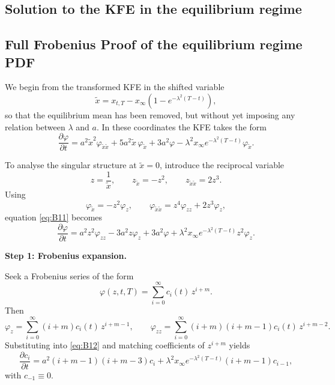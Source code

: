 \documentclass[12pt]{article}
\theoremstyle{statementstyle}
\begin{document}
\begin{appendices}
\section{Solution to the KFE in the equilibrium regime}
\label{appendix:B}

\subsection{Full Frobenius Proof of the equilibrium regime PDF}
\label{appendix:B1}

We begin from the transformed KFE in the shifted variable
\[
\widetilde{x}
=
x_{t,T}
-
x_{\infty}\!\left(1-e^{-\lambda^{2}(T-t)}\right),
\]
so that the equilibrium mean has been removed, but without yet imposing any
relation between \(\lambda\) and \(a\). In these coordinates the KFE takes the form
\begin{equation}
\frac{\partial \varphi}{\partial t}
=
a^{2}\widetilde{x}^{2}\varphi_{\widetilde{x}\widetilde{x}}
+
5a^{2}\widetilde{x}\,\varphi_{\widetilde{x}}
+
3a^{2}\varphi
-
\lambda^{2}x_{\infty}e^{-\lambda^{2}(T-t)}\varphi_{\widetilde{x}}.
\tag{B.1.1}\label{eq:B11}
\end{equation}

To analyse the singular structure at \(\widetilde{x}=0\), introduce the reciprocal
variable
\[
z=\frac{1}{\widetilde{x}},
\qquad
z_{\widetilde{x}}=-z^{2},
\qquad
z_{\widetilde{x}\widetilde{x}}=2z^{3}.
\]
Using
\[
\varphi_{\widetilde{x}}=-z^{2}\varphi_{z},
\qquad
\varphi_{\widetilde{x}\widetilde{x}}
=
z^{4}\varphi_{zz}+2z^{3}\varphi_{z},
\]
equation \eqref{eq:B11} becomes
\begin{equation}
\frac{\partial \varphi}{\partial t}
=
a^{2}z^{2}\varphi_{zz}
-
3a^{2}z\varphi_{z}
+
3a^{2}\varphi
+
\lambda^{2}x_{\infty}e^{-\lambda^{2}(T-t)}z^{2}\varphi_{z}.
\tag{B.1.2}\label{eq:B12}
\end{equation}

\medskip
\noindent\textbf{Step 1: Frobenius expansion.}

Seek a Frobenius series of the form
\[
\varphi(z,t,T)=\sum_{i=0}^{\infty} c_i(t)\,z^{i+m}.
\]
Then
\[
\varphi_z
=
\sum_{i=0}^{\infty}(i+m)c_i(t)\,z^{i+m-1},
\qquad
\varphi_{zz}
=
\sum_{i=0}^{\infty}(i+m)(i+m-1)c_i(t)\,z^{i+m-2}.
\]
Substituting into \eqref{eq:B12} and matching coefficients of \(z^{i+m}\) yields
\begin{equation}
\frac{\partial c_i}{\partial t}
=
a^{2}(i+m-1)(i+m-3)c_i
+
\lambda^{2}x_{\infty}e^{-\lambda^{2}(T-t)}(i+m-1)c_{i-1},
\tag{B.1.3}\label{eq:B13}
\end{equation}
with \(c_{-1}\equiv 0\).


\end{appendices}
\end{document}
